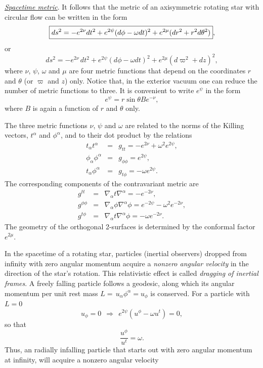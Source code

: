 \documentclass[12pt]{article}
\def\be{\begin{equation}}
\def\ee{\end{equation}}
\def\ba{\begin{eqnarray}}
\def\ea{\end{eqnarray}}
\newcommand{\bsube}{\begin{subequations}}
\newcommand{\esube}{\end{subequations}}
\begin{document}
\vskip0.8cm

\noindent\textit{\uline{Spacetime metric}}. It follows that the metric of an axisymmetric rotating star with circular flow can be written in the form
\begin{equation}
  \boxed{ds^2 = -e^{2 \nu} dt^2 + e^{2 \psi} (d \phi - \omega dt)^2 + e^{2
\mu} (dr^2+r^2 d \theta^2)},
\label{eq:metric}
\index{metric!rotating star}\index{rotating stars!metric}\end{equation}
or 
\be
\boxed{ ds^2 = -e^{2\nu}\, dt^2 + e^{2\psi}(d\phi - \omega dt)^2
+ e^{2\mu} (d\varpi^2 + dz)^2}, 
\label{dsq}
\ee
where $\nu$, $\psi$, $\omega$ and $\mu $ are four metric functions
that depend on the coordinates $r$ and $\theta$ (or $\varpi$ and $z$) only. Notice that, in
the exterior vacuum one can reduce the number
of metric functions to three. 
It is convenient to write  $e^\psi$ in the form \cite{Bardeen73}
\begin{equation}
e^\psi=r \sin \theta B e^{-\nu},
\end{equation}
where $B$ is again a function of $r$ and $\theta$ only.
  



The three metric functions $\nu$, $\psi$ and
$\omega$ are related to the norms of the Killing vectors,  
$t^\alpha$ and $\phi^\alpha$, and to their dot product by the 
relations 
\bsube
\begin{eqnarray}
t_\alpha t^\alpha &=& g_{tt}= -e^{2\nu} + \omega^2 e^{2\psi}, \\
\phi_\alpha\phi^\alpha &=& g_{\phi \phi}= e^{2\psi}, \\
t_\alpha\phi^\alpha &=& g_{t\phi}= -\omega e^{2\psi}.
\end{eqnarray}\label{eq:killnorms}
\esube
The corresponding components of the contravariant metric are 
\bsube 
\ba
g^{tt} &=& \nabla_\alpha t \nabla^\alpha = -e^{-2\nu},\\
g^{\phi\phi}&=& \nabla_\alpha \phi \nabla^\alpha\phi 
        =  e^{-2\psi}-\omega^2 e^{-2\nu},\\
g^{t\phi}&=& \nabla_\alpha t \nabla^\alpha\phi = -\omega e^{-2\nu}.
\ea\esube
The geometry of the orthogonal 2-surfaces is determined by the
conformal factor $e^{2\mu}$.

\vskip0.8cm

In
the spacetime of a rotating star,  particles (inertial observers) dropped from infinity with zero angular momentum
acquire a \textit{nonzero
angular velocity} in the direction of the star's rotation. This relativistic effect is called  \textit{dragging of inertial frames}. A freely falling particle follows a geodesic, along which its angular momentum per unit rest mass  $L =\,u_\alpha \phi^\alpha =u_\phi$ is conserved. For a particle with $L=0$ 
\[
       u_\phi=0 \ \ \Rightarrow \ \ e^{2\psi}(u^\phi -\omega u^t)=0,
\] 
so that  
\be 
\boxed{\frac{u^\phi}{u^t} =\omega}.    
\ee
Thus, an radially infalling particle
that starts out with zero angular momentum at infinity, will acquire a nonzero angular velocity
\end{document}
